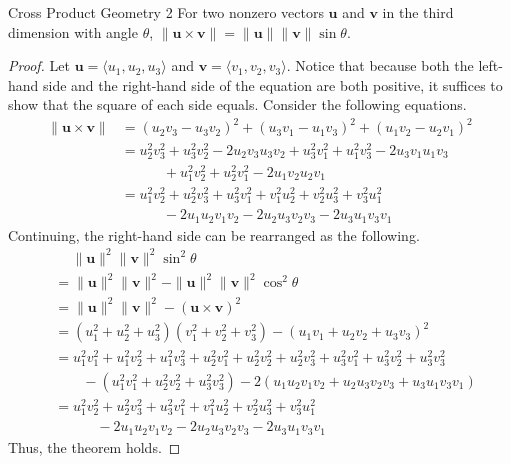 \documentclass[../../main.tex]{subfiles}
\begin{document}
\begin{theorem}{}{Cross Product Geometry 2}
For two nonzero vectors $\mathbf{u}$ and $\mathbf{v}$ in the third
dimension with angle $\theta$, $\| \mathbf{u} \times \mathbf{v} \|
= \| \mathbf{u} \| \| \mathbf{v} \| \sin\theta$.
\end{theorem}
\begin{proof}
Let $\mathbf{u} = \langle u_1, u_2, u_3 \rangle$ and
$\mathbf{v} = \langle v_1, v_2, v_3 \rangle$. Notice that because
both the left-hand side and the right-hand side of the equation
are both positive, it suffices to show that the square of each
side equals. Consider the following equations.
\begin{align*}
    \| \mathbf{u} \times \mathbf{v} \|
    &= (u_2v_3 - u_3v_2)^2 + (u_3v_1 - u_1v_3)^2
        + (u_1v_2 - u_2v_1)^2 \\
    &= u_2^2v_3^2 + u_3^2v_2^2 - 2u_2v_3u_3v_2
        + u_3^2v_1^2 + u_1^2v_3^2 - 2u_3v_1u_1v_3 \\
    &\qquad\quad+ u_1^2v_2^2 + u_2^2v_1^2 - 2u_1v_2u_2v_1 \\
    &= u_1^2v_2^2 + u_2^2v_3^2 + u_3^2v_1^2
        + v_1^2u_2^2 + v_2^2u_3^2 + v_3^2u_1^2 \\
    &\qquad\quad- 2u_1u_2v_1v_2 - 2u_2u_3v_2v_3 - 2u_3u_1v_3v_1
\end{align*}
Continuing, the right-hand side can be rearranged as the following.
\begin{align*}
    &\quad\ \| \mathbf{u} \|^2 \| \mathbf{v} \|^2 \sin^2\theta \\
    &= \| \mathbf{u} \|^2 \| \mathbf{v} \|^2
        - \| \mathbf{u} \|^2 \| \mathbf{v} \|^2 \cos^2\theta \\
    &= \| \mathbf{u} \|^2 \| \mathbf{v} \|^2
        - (\mathbf{u} \times \mathbf{v})^2 \\
    &= (u_1^2 + u_2^2 + u_3^2)(v_1^2 + v_2^2 + v_3^2)
        - (u_1v_1 + u_2v_2 + u_3v_3)^2 \\
    &= u_1^2v_1^2 + u_1^2v_2^2 + u_1^2v_3^2
        + u_2^2v_1^2 + u_2^2v_2^2 + u_2^2v_3^2
        + u_3^2v_1^2 + u_3^2v_2^2 + u_3^2v_3^2 \\
    &\qquad - (u_1^2v_1^2 + u_2^2v_2^2 + u_3^2v_3^2)
        - 2(u_1u_2v_1v_2 + u_2u_3v_2v_3 + u_3u_1v_3v_1) \\
    &= u_1^2v_2^2 + u_2^2v_3^2 + u_3^2v_1^2
        + v_1^2u_2^2 + v_2^2u_3^2 + v_3^2u_1^2 \\
    &\qquad\quad- 2u_1u_2v_1v_2 - 2u_2u_3v_2v_3 - 2u_3u_1v_3v_1
\end{align*}
Thus, the theorem holds.
\end{proof}
\end{document}
